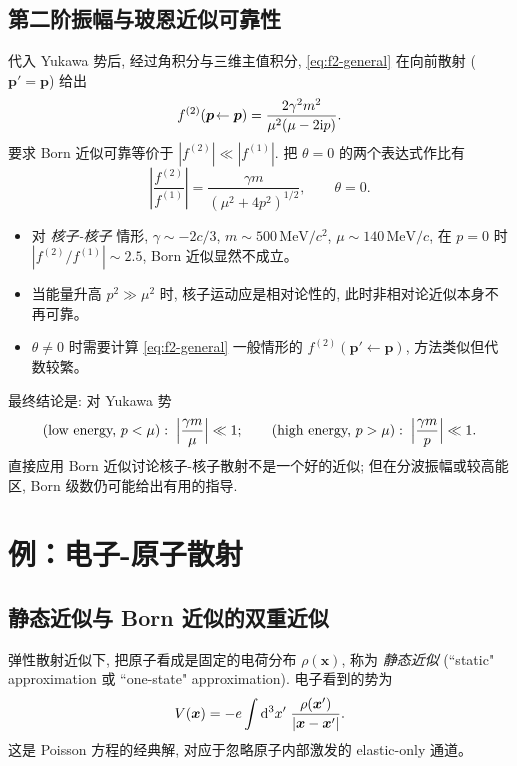 \subsection{第二阶振幅与玻恩近似可靠性}

代入 Yukawa 势后, 经过角积分与三维主值积分, \eqref{eq:f2-general} 在向前散射 ($\bm p'=\bm p$) 给出
\begin{equation}
f^{(2)}(\bm p\!\leftarrow\bm p)
=\frac{2\gamma^{2}m^{2}}{\mu^{2}(\mu-2\mathrm{i} p)}.
\label{eq:f2-yukawa-fwd}
\end{equation}
要求 Born 近似可靠等价于 $|f^{(2)}|\ll|f^{(1)}|$. 把 $\theta=0$ 的两个表达式作比有
\begin{equation}
\left|\frac{f^{(2)}}{f^{(1)}}\right|=\frac{\gamma m}{(\mu^{2}+4p^{2})^{1/2}},\qquad \theta=0.
\label{eq:ratio-yukawa}
\end{equation}

\begin{itemize}
  \item 对 \emph{核子-核子} 情形, $\gamma\sim -2c/3$, $m\sim 500\,\mathrm{MeV}/c^{2}$, $\mu\sim 140\,\mathrm{MeV}/c$, 在 $p=0$ 时 $|f^{(2)}/f^{(1)}|\sim 2.5$, Born 近似显然不成立。
  \item 当能量升高 $p^{2}\gg\mu^{2}$ 时, 核子运动应是相对论性的, 此时非相对论近似本身不再可靠。
  \item $\theta\ne 0$ 时需要计算 \eqref{eq:f2-general} 一般情形的 $f^{(2)}(\bm p'\!\leftarrow\bm p)$, 方法类似但代数较繁。
\end{itemize}

\noindent 最终结论是: 对 Yukawa 势
\begin{equation}
\text{(low energy, } p<\mu\text{)}: \;\Bigl|\frac{\gamma m}{\mu}\Bigr|\ll 1;\qquad
\text{(high energy, } p>\mu\text{)}: \;\Bigl|\frac{\gamma m}{p}\Bigr|\ll 1.
\end{equation}
直接应用 Born 近似讨论核子-核子散射不是一个好的近似; 但在分波振幅或较高能区, Born 级数仍可能给出有用的指导.

\section{例：电子-原子散射}\label{sec:e-atom}

\subsection{静态近似与 Born 近似的双重近似}

弹性散射近似下, 把原子看成是固定的电荷分布 $\rho(\bm x)$, 称为 \emph{静态近似} (``static" approximation 或 ``one-state" approximation). 电子看到的势为
\begin{equation}
V(\bm x)=-e\int\mathrm{d}^{3}x'\;\frac{\rho(\bm x')}{|\bm x-\bm x'|}.
\end{equation}
这是 Poisson 方程的经典解, 对应于忽略原子内部激发的 elastic-only 通道。

